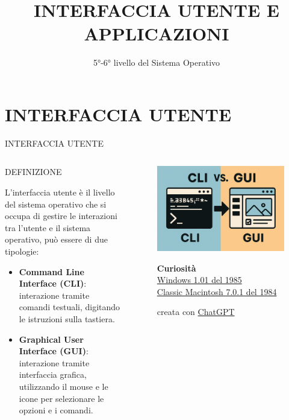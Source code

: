 \documentclass[aspectratio=1610]{beamer}
\title{INTERFACCIA UTENTE E APPLICAZIONI}
\subtitle{5°-6° livello del Sistema Operativo}
\date{}
\institute{\textit{
        Fonti:
        \begin{itemize}
            \item[-] \href{https://www.unimi.it/it/corsi/laurea-triennale/informatica}{Appunti Università degli Studi di Milano}
        \end{itemize}
    }
}
\begin{document}
\begin{frame}
    \titlepage
\end{frame}

\section{INTERFACCIA UTENTE}

\begin{frame}{INTERFACCIA UTENTE}
    \begin{columns}
            \begin{alertblock}{DEFINIZIONE}
                \begin{minipage}{0.97\linewidth}
                    \justifying
                    L'interfaccia utente è il livello del sistema operativo che si occupa di gestire le interazioni tra 
                    l'utente e il sistema operativo, può essere di due tipologie:
                    \begin{itemize}
                        \item \textbf{Command Line Interface (CLI)}: interazione tramite comandi testuali, digitando le istruzioni sulla tastiera.
                        \item \textbf{Graphical User Interface (GUI)}: interazione tramite interfaccia grafica, utilizzando il mouse e le icone per selezionare le opzioni e i comandi.
                    \end{itemize}
                \end{minipage}
            \end{alertblock}
            \begin{figure}
                \includegraphics[width=\linewidth]{img/CLIvsGUI.png}
                \caption{{creata con \href{https://chatgpt.com/}{ChatGPT}}}
                \tiny{\textbf{Curiosità}}\\
                \tiny{\href{https://classicreload.com/Windows-1-01.html}{Windows 1.01 del 1985}}\\
                \tiny{\href{https://jamesfriend.com.au/pce-js/}{Classic Macintosh 7.0.1 del 1984}}
            \end{figure}
    \end{columns}
\end{frame}
\end{document}
